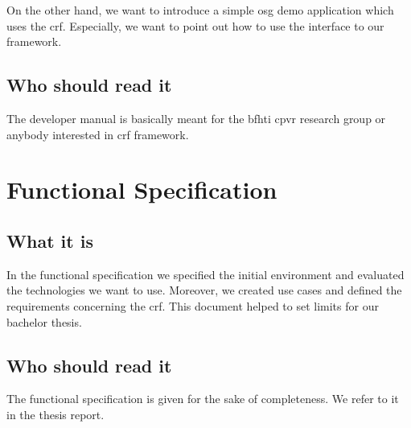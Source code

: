 On the other hand, we want to introduce a simple \gls{osg} demo application which uses the \gls{crf}. Especially, we want to point out how to use the interface to our framework.

\subsection*{Who should read it}
The developer manual is basically meant for the \gls{bfhti} \gls{cpvr} research group or anybody interested in \gls{crf} framework.

\section*{Functional Specification}

\subsection*{What it is}
In the functional specification we specified the initial environment and evaluated the technologies we want to use. Moreover, we created use cases and defined the requirements concerning the \gls{crf}. This document helped to set limits for our bachelor thesis.

\subsection*{Who should read it}
The functional specification is given for the sake of completeness. We refer to it in the thesis report.
